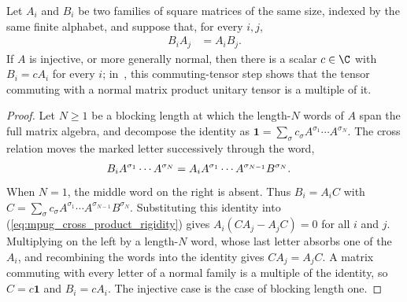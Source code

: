 \begin{lemma}
    \label{thm:mpug_cross_product_rigidity}
    \leanok
    Let $A_i$ and $B_i$ be two families of square matrices of the same size,
    indexed by the same finite alphabet, and suppose that, for every $i,j$,
    \begin{align}
        B_iA_j & =A_iB_j.
        \label{eq:mpug_cross_product_rigidity}
    \end{align}
    If $A$ is injective, or more generally normal, then there is a scalar
    $c\in\C$ with $B_i=cA_i$ for every $i$;
    in~\cite[lines~1255--1325]{FrancoRubio2025MPUGauging}, this
    commuting-tensor step shows that the tensor commuting with a normal
    matrix product unitary tensor is a multiple of it.
\end{lemma}

\begin{proof}\leanok
    Let $N\geq1$ be a blocking length at which the length-$N$ words of $A$
    span the full matrix algebra, and decompose the identity as
    $\mathbf 1=\sum_\sigma c_\sigma A^{\sigma_1}\cdots A^{\sigma_N}$. The
    cross relation moves the marked letter successively through the word,
    \begin{align}
        B_iA^{\sigma_1}\cdots A^{\sigma_N}
         & =A_iA^{\sigma_1}\cdots A^{\sigma_{N-1}}B^{\sigma_N}.
        \notag
    \end{align}
    When $N=1$, the middle word on the right is absent. Thus $B_i=A_iC$ with
    $C=\sum_\sigma c_\sigma
        A^{\sigma_1}\cdots A^{\sigma_{N-1}}B^{\sigma_N}$.
    Substituting this identity into
    (\ref{eq:mpug_cross_product_rigidity}) gives
    $A_i(CA_j-A_jC)=0$ for all $i$ and $j$. Multiplying on the left by a
    length-$N$ word, whose last letter absorbs one of the $A_i$, and
    recombining the words into the identity gives $CA_j=A_jC$. A matrix
    commuting with every letter of a normal family is a multiple of the
    identity, so $C=c\mathbf 1$ and $B_i=cA_i$. The injective case is the
    case of blocking length one.
\end{proof}

